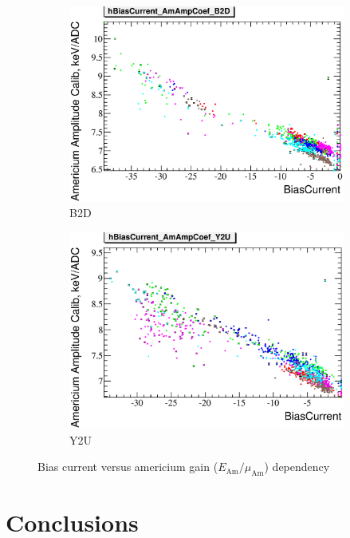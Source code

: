 \documentclass[a4paper]{article}
\begin{document}
\begin{figure}[p]
\begin{subfigure}[b]{0.5\textwidth}
\includegraphics[width=\textwidth]{gfx/run13_alpha_study/B2D/c_hBiasCurrent_AmAmpCoef.eps}
\caption{B2D}\label{bc_vs_gain-b2d}
\end{subfigure}
\begin{subfigure}[b]{0.5\textwidth}
\includegraphics[width=\textwidth]{gfx/run13_alpha_study/Y2U/c_hBiasCurrent_AmAmpCoef.eps}
\caption{Y2U}\label{bc_vs_gain-y2u}
\end{subfigure}

\caption{Bias current versus americium gain ($E_{\text{Am}} / \mu_{\text{Am}}$) dependency}
\label{fig:bc_vs_gain}
\end{figure}


\section{Conclusions}
\end{document}

